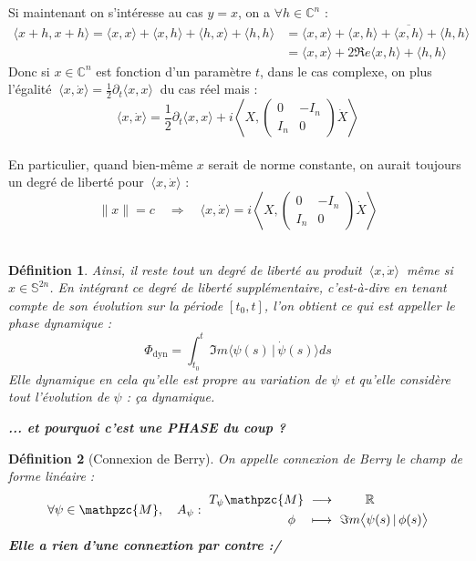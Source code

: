 \documentclass[hidelinks, french, oneside]{article}
\newcommand{\R}{\mathbb{R}}
\newcommand{\C}{\mathbb{C}}
\renewcommand{\S}{\mathbb{S}}
\newcommand{\lr}{\longrightarrow}
\newcommand{\Lr}{\Longrightarrow}
\newcommand{\phased}{\Phi_{\text{dyn}}}
\theoremstyle{enonce}
\newtheorem{definition}{Définition}
\theoremstyle{special}
\theoremstyle{rq}
\theoremstyle{exo}
\theoremstyle{demo}
\begin{document}
Si maintenant on s'intéresse au cas $y=x$, on a $\forall h\in\C^n$ :
\begin{align*}
\langle x+h, x+h \rangle = \langle x, x \rangle + \langle x, h \rangle + \langle h, x \rangle + \langle h, h \rangle 
	&= \langle x, x \rangle + \langle x, h \rangle  + \overline{\langle x, h \rangle }+ \langle h, h \rangle \\
	&= \langle x, x \rangle + 2\Re e \langle x, h \rangle + \langle h, h \rangle
\end{align*}
Donc si $x\in\C^n$ est fonction d'un paramètre $t$, dans le cas complexe, on plus l'égalité $\ \langle x, \dot{x} \rangle = \frac{1}{2}\partial_t\langle x, x \rangle\ $ du cas réel mais :
\[\langle x, \dot{x} \rangle = \frac{1}{2}\partial_t\langle x, x \rangle + i\left\langle X,\begin{pmatrix} 0 & -I_n \\ I_n & 0 \end{pmatrix}\dot{X}\right\rangle\]
\\
En particulier, quand bien-même $x$ serait de norme constante, on aurait toujours un degré de liberté pour $\ \langle x, \dot{x} \rangle$ :
\[\|x\|=c\quad \Lr\quad \langle x, \dot{x} \rangle = i\left\langle X,\begin{pmatrix} 0 & -I_n \\ I_n & 0 \end{pmatrix}\dot{X}\right\rangle\]
\\

\begin{definition}\label{def:phase_dyn}
	Ainsi, il reste tout un degré de liberté au produit $\ \langle x, \dot{x} \rangle\ $ même si $x\in\S^{2n}$. En intégrant ce degré de liberté supplémentaire, c'est-à-dire en tenant compte de son évolution sur la période $[t_0,t]$, l'on obtient ce qui est appeller le \textit{phase dynamique} :
	\[\phased = \int_{t_0}^t \Im m \big\langle \psi(s) \, |\, \dot{\psi}(s) \big\rangle ds\]
	Elle dynamique en cela qu'elle est propre au variation de $\psi$ et qu'elle considère tout l'évolution de $\psi$ : ça dynamique.
	
	\textbf{... et pourquoi c'est une PHASE du coup ?}
\end{definition}


\begin{definition}[Connexion de Berry]\label{def:berry_connx}
On appelle \textit{connexion de Berry} le champ de forme linéaire :
\begin{equation}\label{eq:berry_connx}
	\forall \psi\in\mathpzc{M},\quad A_\psi :\ \begin{aligned} T_\psi\mathpzc{M}\ &\lr\qquad\ \R \\ \phi\quad &\longmapsto\ \Im m \big\langle \psi(s) \, |\, \phi(s) \big\rangle
	\end{aligned}
\end{equation}
\textbf{Elle a rien d'une connextion par contre :/}
\end{definition}
\end{document}
